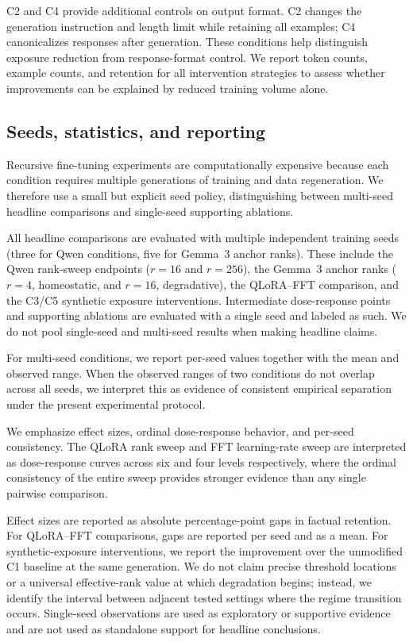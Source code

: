 \documentclass[a4paper,fleqn]{cas-dc}
\begin{document}
C2 and C4 provide additional controls on output format. C2 changes the generation
instruction and length limit while retaining all examples; C4 canonicalizes
responses after generation. These conditions help distinguish exposure reduction
from response-format control. We report token counts, example counts, and
retention for all intervention strategies to assess whether improvements can be
explained by reduced training volume alone.

\subsection{Seeds, statistics, and reporting}\label{sec:statistics}

Recursive fine-tuning experiments are computationally expensive because each
condition requires multiple generations of training and data regeneration. We
therefore use a small but explicit seed policy, distinguishing between
multi-seed headline comparisons and single-seed supporting ablations.

All headline comparisons are evaluated with multiple independent training seeds
(three for Qwen conditions, five for Gemma~3 anchor ranks). These
include the Qwen rank-sweep endpoints ($r=16$ and $r=256$), the Gemma~3 anchor
ranks ($r=4$, homeostatic, and $r=16$, degradative), the QLoRA--FFT comparison, and the C3/C5 synthetic
exposure interventions. Intermediate dose-response points and supporting
ablations are evaluated with a single seed and labeled as such. We do not pool
single-seed and multi-seed results when making headline claims.

For multi-seed conditions, we report per-seed values together with the mean and
observed range. When the observed ranges of two conditions do not overlap across
all seeds, we interpret this as evidence of consistent empirical separation
under the present experimental protocol.

We emphasize
effect sizes, ordinal dose-response behavior, and per-seed consistency. The
QLoRA rank sweep and FFT learning-rate sweep are interpreted as dose-response
curves across six and four levels respectively, where the ordinal consistency of
the entire sweep provides stronger evidence than any single pairwise comparison.

Effect sizes are reported as absolute percentage-point gaps in factual retention.
For QLoRA--FFT comparisons, gaps are reported per seed and as a mean. For
synthetic-exposure interventions, we report the improvement over the unmodified
C1 baseline at the same generation. We do not claim precise threshold locations
or a universal effective-rank value at which degradation begins; instead, we
identify the interval between adjacent tested settings where the regime
transition occurs. Single-seed observations are used as exploratory or
supportive evidence and are not used as standalone support for headline
conclusions.
\end{document}

